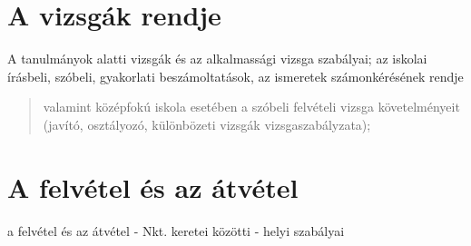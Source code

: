 
\section{A vizsgák rendje}\label{a-vizsguxe1k-rendje}

A tanulmányok alatti vizsgák és az alkalmassági vizsga szabályai; az
iskolai írásbeli, szóbeli, gyakorlati beszámoltatások, az ismeretek
számonkérésének rendje

\begin{quote}
valamint középfokú iskola esetében a szóbeli felvételi vizsga
követelményeit (javító, osztályozó, különbözeti vizsgák
vizsgaszabályzata);
\end{quote}

\section{A felvétel és az
átvétel}\label{a-felvuxe9tel-uxe9s-az-uxe1tvuxe9tel}

a felvétel és az átvétel - Nkt. keretei közötti - helyi szabályai

